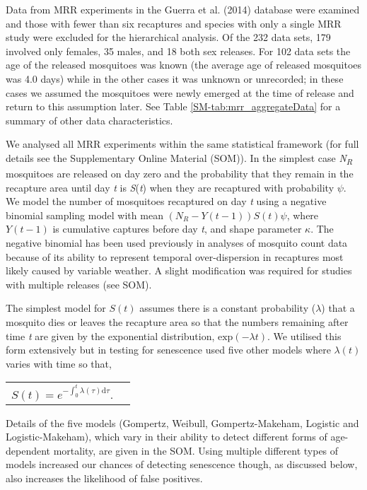 \documentclass[]{article}
\begin{document}
Data from MRR experiments in the Guerra et al. (2014) database were
examined and those with fewer than six recaptures and species with only
a single MRR study were excluded for the hierarchical analysis. Of the
232 data sets, 179 involved only females, 35 males, and 18 both sex
releases. For 102 data sets the age of the released mosquitoes was known
(the average age of released mosquitoes was 4.0 days) while in the other
cases it was unknown or unrecorded; in these cases we assumed the
mosquitoes were newly emerged at the time of release and return to this
assumption later. See Table \ref{SM-tab:mrr_aggregateData} for a summary of other data characteristics.

We analysed all MRR experiments within the same statistical framework
(for full details see the Supplementary Online Material (SOM)). In the
simplest case \emph{N\textsubscript{R}} mosquitoes are released on day
zero and the probability that they remain in the recapture area until
day \emph{t} is \emph{S}(\emph{t}) when they are recaptured with
probability $\psi$. We model the number of mosquitoes recaptured on
day \emph{t} using a negative binomial sampling model with mean
\(\left( N_{R} - Y\left( t - 1 \right) \right)S\left( t \right)\psi\),
where \(Y\left( t - 1 \right)\) is cumulative captures before day
\emph{t}, and shape parameter $\kappa$. The negative binomial has been
used previously in analyses of mosquito count data \citep{service1971studies,nedelman1983negative} because of its ability to
represent temporal over-dispersion in recaptures most likely caused by
variable weather. A slight modification was required for studies with
multiple releases (see SOM).

The simplest model for $S(t)$ assumes there is a constant
probability ($\lambda$) that a mosquito dies or leaves the recapture area
so that the numbers remaining after time \emph{t} are given by the
exponential distribution, $\text{exp}( -\lambda t )$.
We utilised this form extensively but in testing for senescence used
five other models where $\lambda(t)$ varies with time so that,

\begin{longtable}[]{@{}ll@{}}
	\(S\left( t \right) = e^{- \int_{0}^{t}{\lambda\left( \tau \right) \mathrm{d}\tau}}.\)
\end{longtable}

Details of the five models (Gompertz, Weibull, Gompertz-Makeham,
Logistic and Logistic-Makeham), which vary in their ability to detect
different forms of age-dependent mortality, are given in the SOM. Using
multiple different types of models increased our chances of detecting
senescence though, as discussed below, also increases the likelihood of
false positives.
\end{document}
